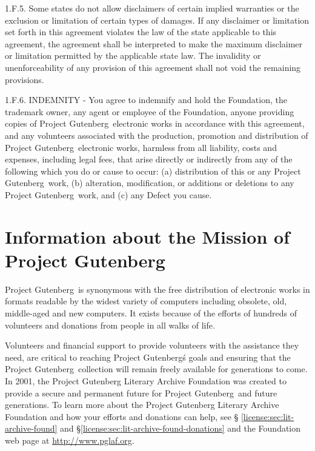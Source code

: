 1.F.5.  Some states do not allow disclaimers of certain implied
warranties or the exclusion or limitation of certain types of damages.
If any disclaimer or limitation set forth in this agreement violates the
law of the state applicable to this agreement, the agreement shall be
interpreted to make the maximum disclaimer or limitation permitted by
the applicable state law.  The invalidity or unenforceability of any
provision of this agreement shall not void the remaining provisions.

1.F.6.  INDEMNITY - You agree to indemnify and hold the Foundation,
the trademark owner, any agent or employee of the Foundation, anyone
providing copies of Project Gutenberg\texttrademark\
electronic works in accordance with this agreement, and any volunteers
associated with the production, promotion and distribution of Project
Gutenberg\texttrademark\ electronic works, harmless
from all liability, costs and expenses, including legal fees, that
arise directly or indirectly from any of the following which you do or
cause to occur: (a) distribution of this or any Project
Gutenberg\texttrademark\ work, (b) alteration,
modification, or additions or deletions to any Project
Gutenberg\texttrademark\ work, and (c) any Defect you
cause.


\section[Mission]
{Information about the Mission of Project Gutenberg\texttrademark}
\label{license:sec:mission}

Project Gutenberg\texttrademark\ is synonymous with
the free distribution of electronic works in formats readable by the
widest variety of computers including obsolete, old, middle-aged and
new computers.  It exists because of the efforts of hundreds of
volunteers and donations from people in all walks of life.

Volunteers and financial support to provide volunteers with the
assistance they need, are critical to reaching Project
Gutenberg\texttrademark\'s goals and ensuring that the Project
Gutenberg\texttrademark\ collection will remain freely available for
generations to come.  In 2001, the Project Gutenberg Literary Archive
Foundation was created to provide a secure and permanent future for
Project Gutenberg\texttrademark\ and future generations.  To learn
more about the Project Gutenberg Literary Archive Foundation and how
your efforts and donations can help, see \S
\ref{license:sec:lit-archive-found} and
\S\ref{license:sec:lit-archive-found-donations} and the Foundation web
page at \url{http://www.pglaf.org}.


